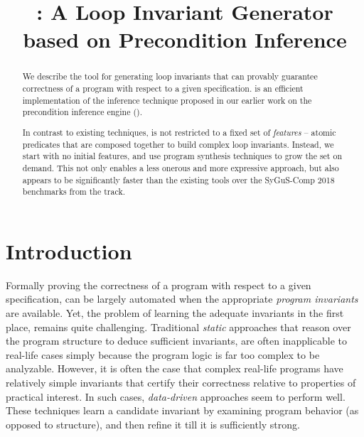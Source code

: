 \documentclass[conference]{IEEEtran}
\begin{document}
\title{\LoopInvGen: A Loop Invariant Generator \\ based on Precondition Inference}

\author{
\and
{}
\and
{}
}




\maketitle

\begin{abstract}
We describe the \LoopInvGen tool for generating loop invariants that can
provably guarantee correctness of a program with respect to a given specification.
\LoopInvGen is an efficient implementation of the inference technique
proposed in our earlier work on the precondition inference engine (\PIE).

In contrast to existing techniques, \LoopInvGen is not restricted to a fixed set of \emph{features} --
atomic predicates that are composed together to build complex loop invariants.
Instead, we start with no initial features, and use program synthesis techniques to grow the set on demand.
This not only enables a less onerous and more expressive approach,
but also appears to be significantly faster than the existing tools over
the SyGuS-Comp 2018 benchmarks from the \INV track.
\end{abstract}




\section{Introduction} \label{subsec:Introduction}

\noindent
Formally proving the correctness of a program with respect to a given specification,
can be largely automated when the appropriate \emph{program invariants} are available.
Yet, the problem of learning the adequate invariants in the first place, remains quite challenging.
Traditional \emph{static} approaches that reason over the program structure to deduce sufficient invariants,
are often inapplicable to real-life cases simply because the program logic is far too complex to be analyzable.
However, it is often the case that complex real-life programs have relatively simple invariants
that certify their correctness relative to properties of practical interest.
In such cases, \emph{data-driven} approaches seem to perform well.
These techniques learn a candidate invariant by examining program behavior (as opposed to structure),
and then refine it till it is sufficiently strong.
\end{document}
